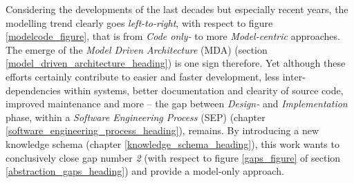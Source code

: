 





Considering the developments of the last decades but especially recent years,
the modelling trend clearly goes \emph{left-to-right}, with respect to figure
\ref{modelcode_figure}, that is from \emph{Code only-} to more \emph{Model-centric}
approaches. The emerge of the \emph{Model Driven Architecture} (MDA) (section
\ref{model_driven_architecture_heading}) is one sign therefore. Yet although
these efforts certainly contribute to easier and faster development, less
inter-dependencies within systems, better documentation and clearity of source
code, improved maintenance and more -- the gap between \emph{Design-} and
\emph{Implementation} phase, within a \emph{Software Engineering Process} (SEP)
(chapter \ref{software_engineering_process_heading}), remains. By introducing a
new knowledge schema (chapter \ref{knowledge_schema_heading}), this work wants
to conclusively close gap number \emph{2} (with respect to figure
\ref{gaps_figure} of section \ref{abstraction_gaps_heading}) and provide a
model-only approach.
